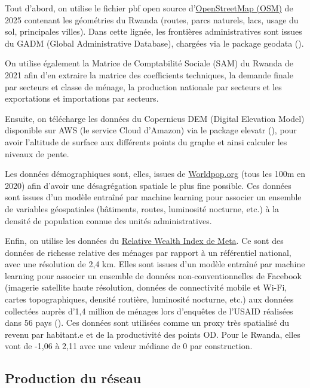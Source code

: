 \documentclass[12pt,a4paper,french]{report}
\begin{document}
	Tout d'abord, on utilise le fichier pbf open source d'\href{https://download.geofabrik.de/africa/rwanda.html}{OpenStreetMap (OSM)} de 2025 contenant les géométries du Rwanda (routes, parcs naturels, lacs, usage du sol, principales villes). Dans cette lignée, les frontières administratives sont issues du GADM (Global Administrative Database), chargées via le package geodata (\cite{Hijmans2026geodata}).
	
	On utilise également la Matrice de Comptabilité Sociale (SAM) du Rwanda de 2021 afin d'en extraire la matrice des coefficients techniques, la demande finale par secteurs et classe de ménage, la production nationale par secteurs et les exportations et importations par secteurs.
	
	Ensuite, on télécharge les données du Copernicus DEM (Digital Elevation Model) disponible sur AWS (le service Cloud d'Amazon) via le package elevatr (\cite{Hollister2023elevatr}), pour avoir l'altitude de surface aux différents points du graphe et ainsi calculer les niveaux de pente.
	
	Les données démographiques sont, elles, issues de \href{https://data.worldpop.org/GIS/Population/Global_2000_2020/2020/RWA/}{Worldpop.org} (tous les 100m en 2020) afin d'avoir une désagrégation spatiale le plus fine possible. Ces données sont issues d'un modèle entraîné par machine learning pour associer un ensemble de variables géospatiales (bâtiments, routes, luminosité nocturne, etc.) à la densité de population connue des unités administratives. 

	Enfin, on utilise les données du \href{https://data.humdata.org/dataset/}{Relative Wealth Index de Meta}. Ce sont des données de richesse relative des ménages par rapport à un référentiel national, avec une résolution de 2,4 km. Elles sont issues d'un modèle entraîné par machine learning pour associer un ensemble de données non-conventionnelles de Facebook (imagerie satellite haute résolution, données de connectivité mobile et Wi-Fi, cartes topographiques, densité routière, luminosité nocturne, etc.) aux données collectées auprès d'1,4 million de ménages lors d'enquêtes de l'USAID réalisées dans 56 pays (\cite{Chi2022}). Ces données sont utilisées comme un proxy très spatialisé du revenu par habitant.e et de la productivité des points OD. Pour le Rwanda, elles vont de -1,06 à 2,11 avec une valeur médiane de 0 par construction.
	
	\subsection{Production du réseau}
	\label{subsec:reseau}
\end{document}

